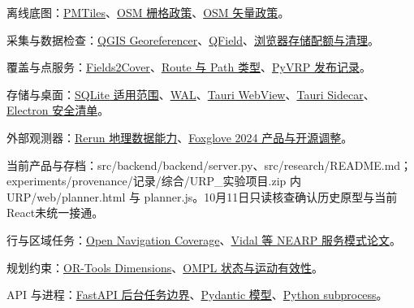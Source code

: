\documentclass[11pt,a4paper]{article}
\newcommand{\referencetext}[1]{{\fontsize{9.4}{14.2}\selectfont#1\par}}
\begin{document}
\referencetext{[T11] 离线底图：\href{https://docs.protomaps.com/pmtiles/}{PMTiles}、\href{https://operations.osmfoundation.org/policies/tiles/}{OSM 栅格政策}、\href{https://operations.osmfoundation.org/policies/vector/}{OSM 矢量政策}。}
\referencetext{[T12] 采集与数据检查：\href{https://docs.qgis.org/3.44/en/docs/user\_manual/managing\_data\_source/georeferencer.html}{QGIS Georeferencer}、\href{https://github.com/opengisch/QField}{QField}、\href{https://developer.mozilla.org/en-US/docs/Web/API/Storage\_API/Storage\_quotas\_and\_eviction\_criteria}{浏览器存储配额与清理}。}
\referencetext{[T13] 覆盖与点服务：\href{https://github.com/Fields2Cover/Fields2Cover}{Fields2Cover}、\href{https://fields2cover.github.io/source/tutorials/basic\_types.html}{Route 与 Path 类型}、\href{https://github.com/PyVRP/PyVRP/releases}{PyVRP 发布记录}。}
\referencetext{[T14] 存储与桌面：\href{https://sqlite.org/whentouse.html}{SQLite 适用范围}、\href{https://sqlite.org/wal.html}{WAL}、\href{https://v2.tauri.app/reference/webview-versions/}{Tauri WebView}、\href{https://v2.tauri.app/develop/sidecar/}{Tauri Sidecar}、\href{https://www.electronjs.org/docs/latest/tutorial/security}{Electron 安全清单}。}
\referencetext{[T15] 外部观测器：\href{https://rerun.io/docs/howto/visualization/geospatial-data}{Rerun 地理数据能力}、\href{https://foxglove.dev/blog/foxglove-2-0-unifying-robotics-observability}{Foxglove 2024 产品与开源调整}。}
\referencetext{[T16] 当前产品与存档：src/\allowbreak{}backend/\allowbreak{}backend/\allowbreak{}server.py、src/\allowbreak{}research/\allowbreak{}README.md；experiments/\allowbreak{}provenance/\allowbreak{}记录/\allowbreak{}综合/\allowbreak{}URP\_\allowbreak{}实验项目.zip 内 URP/\allowbreak{}web/\allowbreak{}planner.html 与 planner.js。10月11日只读核查确认历史原型与当前React未统一接通。}
\referencetext{[T17] 行与区域任务：\href{https://github.com/open-navigation/opennav\_coverage}{Open Navigation Coverage}、\href{https://w1.cirrelt.ca/~vidalt/papers/NEARP-Vidal-Revision-WP.pdf}{Vidal 等 NEARP 服务模式论文}。}
\referencetext{[T18] 规划约束：\href{https://developers.google.com/optimization/routing/dimensions?hl=en}{OR-Tools Dimensions}、\href{https://ompl.kavrakilab.org/stateValidation.html}{OMPL 状态与运动有效性}。}
\referencetext{[T19] API 与进程：\href{https://fastapi.tiangolo.com/tutorial/background-tasks/}{FastAPI 后台任务边界}、\href{https://docs.pydantic.dev/latest/concepts/models/}{Pydantic 模型}、\href{https://docs.python.org/3/library/subprocess.html}{Python subprocess}。}
\end{document}
